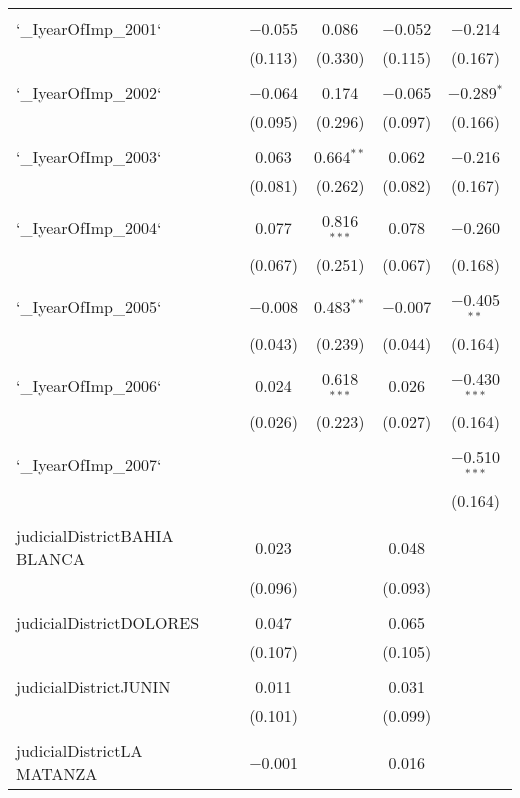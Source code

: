 \documentclass{article}
\begin{document}
\begin{table}[!htbp]
{\begin{tabular}{@{\extracolsep{5pt}}lccccc}
  & & & & & \\ 
 `\_IyearOfImp\_2001` &  & $-$0.055 & 0.086 & $-$0.052 & $-$0.214 \\ 
  &  & (0.113) & (0.330) & (0.115) & (0.167) \\ 
  & & & & & \\ 
 `\_IyearOfImp\_2002` &  & $-$0.064 & 0.174 & $-$0.065 & $-$0.289$^{*}$ \\ 
  &  & (0.095) & (0.296) & (0.097) & (0.166) \\ 
  & & & & & \\ 
 `\_IyearOfImp\_2003` &  & 0.063 & 0.664$^{**}$ & 0.062 & $-$0.216 \\ 
  &  & (0.081) & (0.262) & (0.082) & (0.167) \\ 
  & & & & & \\ 
 `\_IyearOfImp\_2004` &  & 0.077 & 0.816$^{***}$ & 0.078 & $-$0.260 \\ 
  &  & (0.067) & (0.251) & (0.067) & (0.168) \\ 
  & & & & & \\ 
 `\_IyearOfImp\_2005` &  & $-$0.008 & 0.483$^{**}$ & $-$0.007 & $-$0.405$^{**}$ \\ 
  &  & (0.043) & (0.239) & (0.044) & (0.164) \\ 
  & & & & & \\ 
 `\_IyearOfImp\_2006` &  & 0.024 & 0.618$^{***}$ & 0.026 & $-$0.430$^{***}$ \\ 
  &  & (0.026) & (0.223) & (0.027) & (0.164) \\ 
  & & & & & \\ 
 `\_IyearOfImp\_2007` &  &  &  &  & $-$0.510$^{***}$ \\ 
  &  &  &  &  & (0.164) \\ 
  & & & & & \\ 
 judicialDistrictBAHIA BLANCA &  & 0.023 &  & 0.048 &  \\ 
  &  & (0.096) &  & (0.093) &  \\ 
  & & & & & \\ 
 judicialDistrictDOLORES &  & 0.047 &  & 0.065 &  \\ 
  &  & (0.107) &  & (0.105) &  \\ 
  & & & & & \\ 
 judicialDistrictJUNIN &  & 0.011 &  & 0.031 &  \\ 
  &  & (0.101) &  & (0.099) &  \\ 
  & & & & & \\ 
 judicialDistrictLA MATANZA &  & $-$0.001 &  & 0.016 &  \\ 

\end{tabular}}
\end{table}
\end{document}
